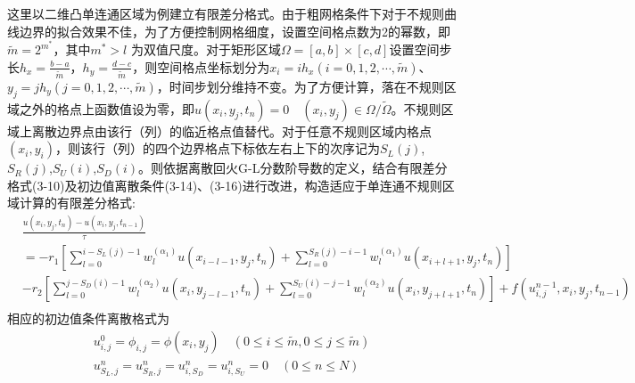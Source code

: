 \documentclass[twoside,UTF8]{nputhesis}
\begin{document}
这里以二维凸单连通区域为例建立有限差分格式。由于粗网格条件下对于不规则曲线边界的拟合效果不佳，为了方便控制网格细度，设置空间格点数为2的幂数，即$\tilde{m}={{2}^{{{m}^{*}}}}$，其中${{m}^{\text{*}}}>l$ 为双值尺度。对于矩形区域$\Omega =[a,b]\times[c,d]$设置空间步长${{h}_{x}}=\frac{b-a}{{\tilde{m}}}$，${{h}_{y}}=\frac{d-c}{{\tilde{m}}}$，则空间格点坐标划分为${{x}_{i}}=i{{h}_{x}}$$(i=0,1,2,\cdots ,\tilde{m})$、${{y}_{j}}=j{{h}_{y}}$$(j=0,1,2,\cdots ,\tilde{m})$，时间步划分维持不变。为了方便计算，落在不规则区域之外的格点上函数值设为零，即$u({{x}_{i}},{{y}_{j}},{{t}_{n}})=0        \quad({{x}_{i}},{{y}_{j}})\in \Omega / \tilde{\Omega }$。不规则区域上离散边界点由该行（列）的临近格点值替代。对于任意不规则区域内格点$({{x}_{i}},{{y}_{i}})$，则该行（列）的四个边界格点下标依左右上下的次序记为${{S}_{L}}(j)$,${{S}_{R}}(j)$,${{S}_{U}}(i)$,${{S}_{D}}(i)$。则依据离散回火G-L分数阶导数的定义，结合有限差分格式(3-10)及初边值离散条件(3-14)、(3-16)进行改进，构造适应于单连通不规则区域计算的有限差分格式:
\begin{equation}
\begin{split}
& \frac{u({{x}_{i}},{{y}_{j}},{{t}_{n}})-u({{x}_{i}},{{y}_{j}},{{t}_{n-1}})}{\tau } \\
& =-{{r}_{1}}\left[ \sum\limits_{l=0}^{i-{{S}_{L}}(j)-1}{w_{l}^{({{\alpha }_{1}})}u({{x}_{i-l-1}},{{y}_{j}},{{t}_{n}})}+\sum\limits_{l=0}^{{{S}_{R}}(j)-i-1}{w_{l}^{({{\alpha }_{1}})}}u({{x}_{i+l+1}},{{y}_{j}},{{t}_{n}}) \right] \\
& -{{r}_{2}}\left[ \sum\limits_{l=0}^{j-{{S}_{D}}(i)-1}{w_{l}^{({{\alpha }_{2}})}u({{x}_{i}},{{y}_{j-l-1}},{{t}_{n}})}+\sum\limits_{l=0}^{{{S}_{U}}(i)-j-1}{w_{l}^{({{\alpha }_{2}})}u({{x}_{i}},{{y}_{j+l+1}},{{t}_{n}})} \right]+f(u_{i,j}^{n-1},{{x}_{i}},{{y}_{j}},{{t}_{n-1}}) \\
\end{split}
\end{equation}
相应的初边值条件离散格式为
\begin{equation}
\begin{array}{l}{u_{i, j}^{0}=\phi_{i, j}=\phi\left(x_{i}, y_{j}\right) \quad(0 \leq i \leq \tilde{m}, 0 \leq j \leq \tilde{m})} \\ {u_{S_{L}, j}^{n}=u_{S_{R}, j}^{n}=u_{i, S_{D}}^{n}=u_{i, S_{U}}^{n}=0 \quad(0 \leq n \leq N)}\end{array}
\end{equation}
\end{document}

